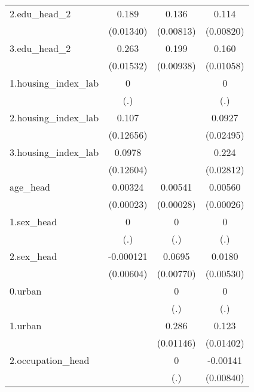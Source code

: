 \begin{table}[htbp]
{\begin{tabular}{l*{3}{c}}
2.edu_head_2&       0.189\sym{***}&       0.136\sym{***}&       0.114\sym{***}\\
            &   (0.01340)         &   (0.00813)         &   (0.00820)         \\
3.edu_head_2&       0.263\sym{***}&       0.199\sym{***}&       0.160\sym{***}\\
            &   (0.01532)         &   (0.00938)         &   (0.01058)         \\
1.housing_index_lab&           0         &                     &           0         \\
            &         (.)         &                     &         (.)         \\
2.housing_index_lab&       0.107         &                     &      0.0927\sym{***}\\
            &   (0.12656)         &                     &   (0.02495)         \\
3.housing_index_lab&      0.0978         &                     &       0.224\sym{***}\\
            &   (0.12604)         &                     &   (0.02812)         \\
age_head    &     0.00324\sym{***}&     0.00541\sym{***}&     0.00560\sym{***}\\
            &   (0.00023)         &   (0.00028)         &   (0.00026)         \\
1.sex_head  &           0         &           0         &           0         \\
            &         (.)         &         (.)         &         (.)         \\
2.sex_head  &   -0.000121         &      0.0695\sym{***}&      0.0180\sym{***}\\
            &   (0.00604)         &   (0.00770)         &   (0.00530)         \\
0.urban     &                     &           0         &           0         \\
            &                     &         (.)         &         (.)         \\
1.urban     &                     &       0.286\sym{***}&       0.123\sym{***}\\
            &                     &   (0.01146)         &   (0.01402)         \\
2.occupation_head&                     &           0         &    -0.00141         \\
            &                     &         (.)         &   (0.00840)         \\

\end{tabular}}
\end{table}
